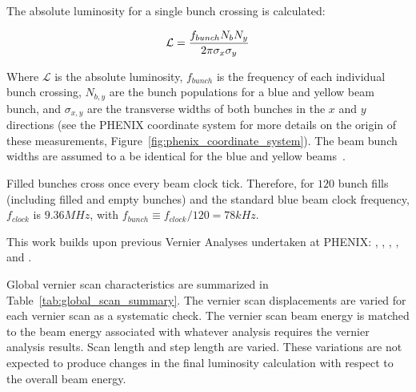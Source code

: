 {\noindent}The absolute luminosity for a single bunch crossing is calculated:

\begin{equation} 
\label{eq:lumi_one_bunch} 
\mathcal{L} = {f_{bunch}N_{b} N_{y}\over{2\pi\sigma_{x}\sigma_{y}}} 
\end{equation}

Where $\mathcal{L}$ is the absolute luminosity, $f_{bunch}$ is the frequency of
each individual bunch crossing, $N_{b,y}$ are the bunch populations for a blue
and yellow beam bunch, and $\sigma_{x,y}$ are the transverse widths of both
bunches in the $x$ and $y$ directions (see the PHENIX coordinate system for more
details on the origin of these measurements,
Figure~\ref{fig:phenix_coordinate_system}). The beam bunch widths are assumed to
a be identical for the blue and yellow beams~\cite{AN888Datta2010}.

Filled bunches cross once every beam clock tick. Therefore, for $120$ bunch
fills (including filled and empty bunches) and the standard blue beam clock
frequency, $f_{clock}$ is $9.36 MHz$, with $f_{bunch} \equiv f_{clock} / 120 =
78 kHz$.

This work builds upon previous Vernier Analyses undertaken at PHENIX:
\cite{AN184Belikov2003}, \cite{an597Bazilevsky2007}, \cite{an688Bennett2008},
\cite{AN888Datta2010}, and \cite{Drees2009}.

Global vernier scan characteristics are summarized in
Table~\ref{tab:global_scan_summary}. The vernier scan displacements are varied
for each vernier scan as a systematic check. The vernier scan beam energy is
matched to the beam energy associated with whatever analysis requires the
vernier analysis results. Scan length and step length are varied. These
variations are not expected to produce changes in the final luminosity
calculation with respect to the overall beam energy.

